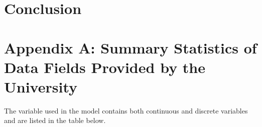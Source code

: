 \documentclass[12pt,english]{report}
\begin{document}
\chapter{Conclusion}

\appendix
\chapter{Appendix A: Summary Statistics of Data Fields Provided by the
University}  \label{app A}


The variable used in the model contains both continuous and discrete variables
and are listed in the table below.
\end{document}
